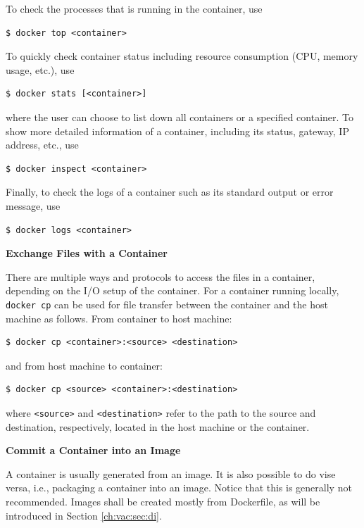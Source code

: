 To check the processes that is running in the container, use
\begin{lstlisting}
$ docker top <container>
\end{lstlisting}

To quickly check container status including resource consumption (CPU, memory usage, etc.), use
\begin{lstlisting}
$ docker stats [<container>]
\end{lstlisting}
where the user can choose to list down all containers or a specified container. To show more detailed information of a container, including its status, gateway, IP address, etc., use
\begin{lstlisting}
$ docker inspect <container>
\end{lstlisting}
Finally, to check the logs of a container such as its standard output or error message, use
\begin{lstlisting}
$ docker logs <container>
\end{lstlisting}

\vspace{0.1in}
\noindent \textbf{Exchange Files with a Container}
\vspace{0.1in}

There are multiple ways and protocols to access the files in a container, depending on the I/O setup of the container. For a container running locally, \verb|docker cp| can be used for file transfer between the container and the host machine as follows. From container to host machine:
\begin{lstlisting}
$ docker cp <container>:<source> <destination>
\end{lstlisting}
and from host machine to container:
\begin{lstlisting}
$ docker cp <source> <container>:<destination>
\end{lstlisting}
where \verb|<source>| and \verb|<destination>| refer to the path to the source and destination, respectively, located in the host machine or the container.

\vspace{0.1in}
\noindent \textbf{Commit a Container into an Image}
\vspace{0.1in}

A container is usually generated from an image. It is also possible to do vise versa, i.e., packaging a container into an image. Notice that this is generally not recommended. Images shall be created mostly from Dockerfile, as will be introduced in Section \ref{ch:vac:sec:di}.

